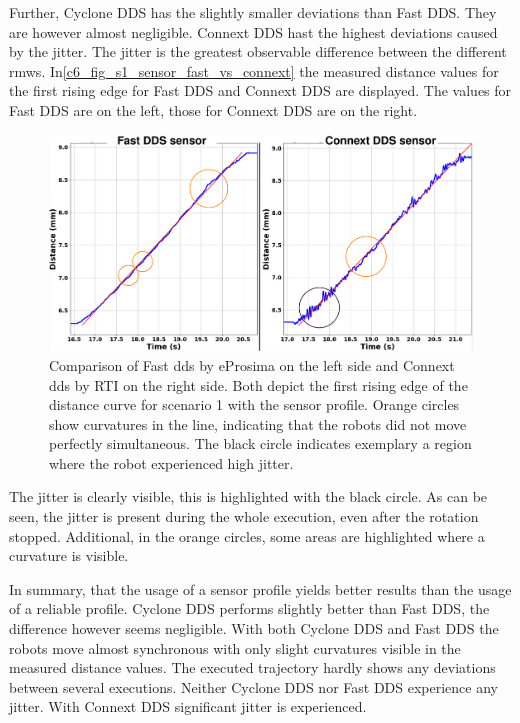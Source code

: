 Further, Cyclone DDS has the slightly smaller deviations than Fast DDS. They are however almost negligible. Connext DDS hast the highest deviations caused by the jitter. The jitter is the greatest observable difference between the different \glspl{rmw}. In\autoref{c6_fig_s1_sensor_fast_vs_connext} the measured distance values for the first rising edge for Fast DDS and Connext DDS are displayed. The values for Fast DDS are on the left, those for Connext DDS are on the right.
\begin{figure}[H]
	\centering
	\includegraphics[width=1\textwidth]{Figures/c6/s1/s1_sensor_fast_vs_connext.png}
	\caption{Comparison of Fast \gls{dds} by eProsima on the left side and Connext \gls{dds} by RTI on the right side. Both depict the first rising edge of the distance curve for scenario 1 with the sensor profile. Orange circles show curvatures in the line, indicating that the robots did not move perfectly simultaneous. The black circle indicates exemplary a region where the robot experienced high jitter. }
	\label{c6_fig_s1_sensor_fast_vs_connext}
\end{figure}
The jitter is clearly visible, this is highlighted with the black circle. As can be seen, the jitter is present during the whole execution, even after the rotation stopped. Additional, in the orange circles, some areas are highlighted where a curvature is visible.

In summary, that the usage of a sensor profile yields better results than the usage of a reliable profile. Cyclone DDS performs slightly better than Fast DDS, the difference however seems negligible. With both Cyclone DDS and Fast DDS the robots move almost synchronous with only slight curvatures visible in the measured distance values. The executed trajectory hardly shows any deviations between several executions. Neither Cyclone DDS nor Fast DDS experience any jitter. With Connext DDS significant jitter is experienced.


